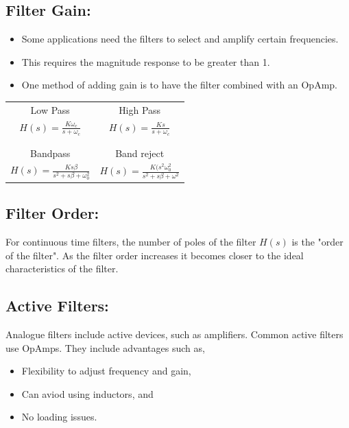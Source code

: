 \documentclass[a5paper]{article}
\begin{document}
	\subsection{Filter Gain:}
	\begin{itemize}
		\item Some applications need the filters to select and amplify certain frequencies.
		\item This requires the magnitude response to be greater than 1.
		\item One method of adding gain is to have the filter combined with an OpAmp.
	\end{itemize}
	\begin{center}
	\begin{tabular}{ c | c }
		Low Pass & High Pass\\
		$H(s)=\frac{K\omega_{c}}{s+\omega_{c}}$ & $H(s)=\frac{Ks}{s+\omega_{c}}$\\\\
		\hline\\
		Bandpass & Band reject\\
		$H(s)=\frac{Ks\beta}{s^{2}+s\beta+\omega_{0}^{2}}$ & $H(s)=\frac{K(s^{2}\omega_{0}^{2}}{s^{2}+s\beta+\omega^{2}}$
	\end{tabular}
	\end{center}
	\subsection{Filter Order:}
	For continuous time filters, the number of poles of the filter $H(s)$ is the "order of the filter". As the filter order increases it becomes closer to the ideal characteristics of the filter.
	\subsection{Active Filters:}
	Analogue filters include active devices, such as amplifiers. Common active filters use OpAmps. They include advantages such as, 
	\begin{itemize}
		\item Flexibility to adjust frequency and gain,
		\item Can aviod using inductors, and
		\item No loading issues.
	\end{itemize}
\end{document}
